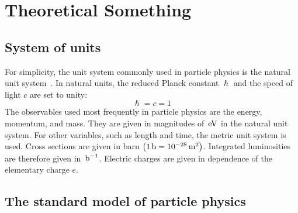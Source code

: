 \chapter{Theoretical Something}\label{chap:introduction}
\minitoc





\section{System of units}\label{sec:units}

For simplicity, the unit system commonly used in particle physics is the natural unit system~\cite{UnitSystem}. In natural units, the reduced Planck constant $\hslash$ and the speed of light $c$ are set to unity:
\begin{equation}
 \hslash=c=1
\end{equation}
The observables used most frequently in particle physics are the energy, momentum, and mass. They are given in magnitudes of $\,\text{e\hspace{-.08em}V}$ in the natural unit system. For other variables, such as length and time, the metric unit system is used. Cross sections are given in barn $\left(1\,\text{b}=10^{-28}\,\text{m}^2\right)$. Integrated luminosities are therefore given in $\mbox{\ensuremath{\,\text{b}^\text{$-$1}}}$. Electric charges are given in dependence of the elementary charge $e$.

\section{The standard model of particle physics}\label{sec:SM}

